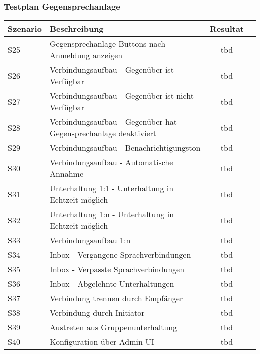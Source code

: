 \subsubsection{Testplan Gegensprechanlage}
\begin{table}[h]
    \centering
    \begin{tabular}{|l|p{11cm}|c|c|}
        \hline
        \textbf{Szenario} & \textbf{Beschreibung}                                                                                                                                  & \textbf{Resultat} \\
        \hline
        S25         & Gegensprechanlage Buttons nach Anmeldung anzeigen & tbd\\
        \hline
        S26         & Verbindungsaufbau - Gegenüber ist Verfügbar & tbd\\
        \hline
        S27         & Verbindungsaufbau - Gegenüber ist nicht Verfügbar & tbd\\
        \hline
        S28         & Verbindungsaufbau - Gegenüber hat Gegensprechanlage deaktiviert & tbd\\
        \hline
        S29         & Verbindungsaufbau - Benachrichtigungston & tbd\\
        \hline
        S30         & Verbindungsaufbau - Automatische Annahme & tbd\\
        \hline
        S31         & Unterhaltung 1:1 - Unterhaltung in Echtzeit möglich & tbd\\
        \hline
        S32         & Unterhaltung 1:n - Unterhaltung in Echtzeit möglich & tbd\\
        \hline
        S33         & Verbindungsaufbau 1:n & tbd\\
        \hline
        S34         & Inbox - Vergangene Sprachverbindungen & tbd\\
        \hline
        S35         & Inbox - Verpasste Sprachverbindungen & tbd\\
        \hline
        S36         & Inbox - Abgelehnte Unterhaltungen & tbd\\
        \hline
        S37         & Verbindung trennen durch Empfänger & tbd\\
        \hline
        S38         & Verbindung durch Initiator & tbd\\
        \hline
        S39         & Austreten aus Gruppenunterhaltung & tbd\\
        \hline
        S40         & Konfiguration über Admin UI & tbd\\
        \hline
    \end{tabular}\label{tab:testplan_gegensprechanlage}
\end{table}
\clearpage

